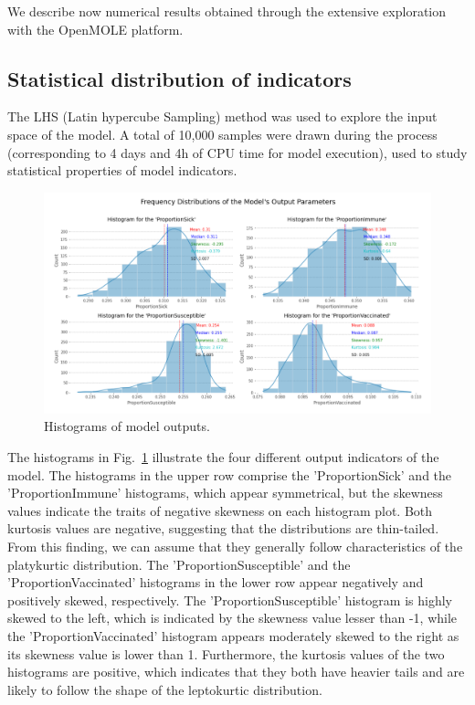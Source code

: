 \documentclass[smallextended]{svjour3}       %
\begin{document}
We describe now numerical results obtained through the extensive exploration with the OpenMOLE platform.


\subsection{Statistical distribution of indicators}

The LHS (Latin hypercube Sampling) method was used to explore the input space of the model. A total of 10,000 samples were drawn during the process (corresponding to 4 days and 4h of CPU time for model execution), used to study statistical properties of model indicators.



\begin{figure}
	\centering
	\includegraphics[width=\linewidth]{figures/histograms.png}
	\caption{Histograms of model outputs.\label{fig:histograms}}
\end{figure}

The histograms in Fig.~\ref{fig:histograms} illustrate the four different output indicators of the model. The histograms in the upper row comprise the 'ProportionSick' and the 'ProportionImmune' histograms, which appear symmetrical, but the skewness values indicate the traits of negative skewness on each histogram plot. Both kurtosis values are negative, suggesting that the distributions are thin-tailed. From this finding, we can assume that they generally follow characteristics of the platykurtic distribution. The 'ProportionSusceptible' and the 'ProportionVaccinated' histograms in the lower row appear negatively and positively skewed, respectively. The 'ProportionSusceptible' histogram is highly skewed to the left, which is indicated by the skewness value lesser than -1, while the 'ProportionVaccinated' histogram appears moderately skewed to the right as its skewness value is lower than 1. Furthermore, the kurtosis values of the two histograms are positive, which indicates that they both have heavier tails and are likely to follow the shape of the leptokurtic distribution.
\end{document}
